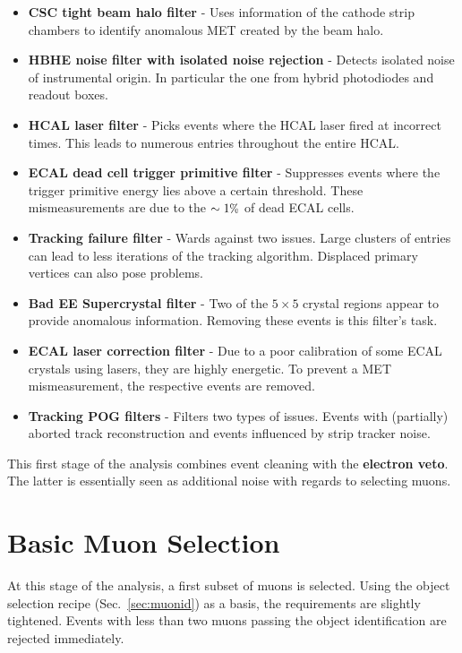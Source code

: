 \begin{itemize}
\item \textbf{CSC tight beam halo filter} - Uses information of the cathode strip chambers to identify anomalous MET created by the beam halo.
\item \textbf{HBHE noise filter with isolated noise rejection} - Detects isolated noise of instrumental origin. In particular the one from hybrid photodiodes and readout boxes.
\item \textbf{HCAL laser filter} - Picks events where the HCAL laser fired at incorrect times. This leads to numerous entries throughout the entire HCAL.
\item \textbf{ECAL dead cell trigger primitive filter} - Suppresses events where the trigger primitive energy lies above a certain threshold. These mismeasurements are due to the $\sim 1\pct$ of dead ECAL cells.
\item \textbf{Tracking failure filter} - Wards against two issues. Large clusters of entries can lead to less iterations of the tracking algorithm. Displaced primary vertices can also pose problems.
\item \textbf{Bad EE Supercrystal filter} - Two of the $5 \times 5$ crystal regions appear to provide anomalous information. Removing these events is this filter's task.
\item \textbf{ECAL laser correction filter} - Due to a poor calibration of some ECAL crystals using lasers, they are highly energetic. To prevent a MET mismeasurement, the respective events are removed. 
\item \textbf{Tracking POG filters} - Filters two types of issues. Events with (partially) aborted track reconstruction and events influenced by strip tracker noise.
\end{itemize}

This first stage of the analysis combines event cleaning with the \textbf{electron veto}. The latter is essentially seen as additional noise with regards to selecting muons.

\section{Basic Muon Selection}
\label{sec:basicmuon}

At this stage of the analysis, a first subset of muons is selected. Using the object selection recipe (Sec.~\ref{sec:muonid}) as a basis, the requirements are slightly tightened. Events with less than two muons passing the object identification are rejected immediately.

